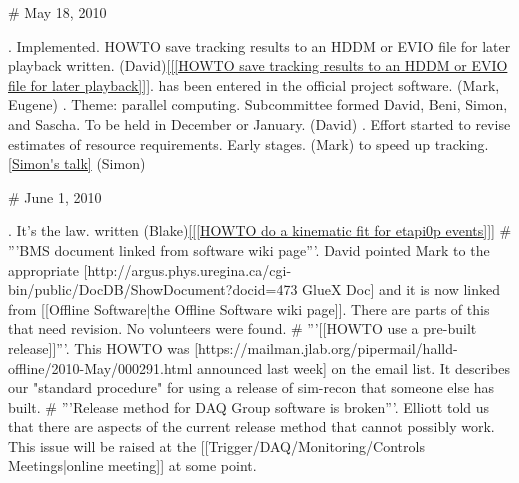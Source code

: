 # May 18, 2010 

. Implemented. HOWTO save tracking results to an HDDM or EVIO file for later playback written. (David)\ref{[[HOWTO save tracking results to an HDDM or EVIO file for later playback]]}.
 has been entered in the official project software. (Mark, Eugene)
. Theme: parallel computing. Subcommittee formed David, Beni, Simon, and Sascha. To be held in December or January. (David)
. Effort started to revise estimates of resource requirements. Early stages. (Mark)
 to speed up tracking.\ref{Simon's talk} (Simon)

# June 1, 2010

. It's the law.
 written (Blake)\ref{[[HOWTO do a kinematic fit for etapi0p events]]}
# '''BMS document linked from software wiki page'''. David pointed Mark to the appropriate [http://argus.phys.uregina.ca/cgi-bin/public/DocDB/ShowDocument?docid=473 GlueX Doc] and it is now linked from [[Offline Software|the Offline Software wiki page]]. There are parts of this that need revision. No volunteers were found.
# '''[[HOWTO use a pre-built release]]'''. This HOWTO was [https://mailman.jlab.org/pipermail/halld-offline/2010-May/000291.html announced last week] on the email list. It describes our "standard procedure" for using a release of sim-recon that someone else has built.
# '''Release method for DAQ Group software is broken'''. Elliott told us that there are aspects of the current release method that cannot possibly work. This issue will be raised at the [[Trigger/DAQ/Monitoring/Controls Meetings|online meeting]] at some point.

